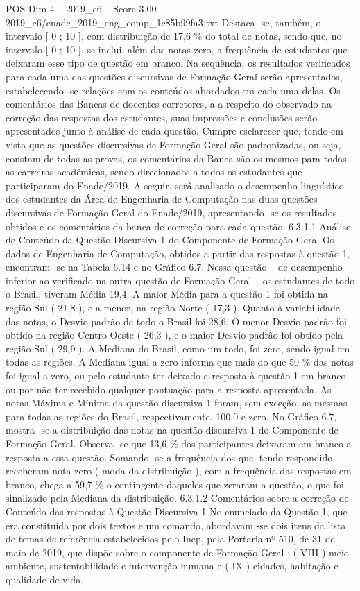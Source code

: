 \begin{textsample}{POS Dim 4 – 2019\_c6 – Score 3.00 – 2019\_c6/enade\_2019\_eng\_comp\_1c85b99fa3.txt}
Destaca -se, também, o intervalo [ 0 ; 10 ], com distribuição de 17,6 \% do total de notas, sendo que, no intervalo [ 0 ; 10 ], se inclui, além das notas zero, a frequência de estudantes que deixaram esse tipo de questão em branco.
Na sequência, os resultados verificados para cada uma das questões discursivas de Formação Geral serão apresentados, estabelecendo -se relações com os conteúdos abordados em cada uma delas.
Os comentários das Bancas de docentes corretores, a a respeito do observado na correção das respostas dos estudantes, suas impressões e conclusões serão apresentados junto à análise de cada questão.
Cumpre esclarecer que, tendo em vista que as questões discursivas de Formação Geral são padronizadas, ou seja, constam de todas as provas, os comentários da Banca são os mesmos para todas as carreiras acadêmicas, sendo direcionados a todos os estudantes que participaram do Enade/2019.
A seguir, será analisado o desempenho linguístico dos estudantes da Área de Engenharia de Computação nas duas questões discursivas de Formação Geral do Enade/2019, apresentando -se os resultados obtidos e os comentários da banca de correção para cada questão. 6.3.1.1 Análise de Conteúdo da Questão Discursiva 1 do Componente de Formação Geral Os dados de Engenharia de Computação, obtidos a partir das respostas à questão 1, encontram -se na Tabela 6.14 e no Gráfico 6.7.
Nessa questão – de desempenho inferior ao verificado na outra questão de Formação Geral – os estudantes de todo o Brasil, tiveram Média 19,4.
A maior Média para a questão 1 foi obtida na região Sul ( 21,8 ), e a menor, na região Norte ( 17,3 ).
Quanto à variabilidade das notas, o Desvio padrão de todo o Brasil foi 28,6.
O menor Desvio padrão foi obtido na região Centro-Oeste ( 26,3 ), e o maior Desvio padrão foi obtido pela região Sul ( 29,9 ).
A Mediana do Brasil, como um todo, foi zero, sendo igual em todas as regiões.
A Mediana igual a zero informa que mais do que 50 \% das notas foi igual a zero, ou pelo estudante ter deixado a resposta à questão 1 em branco ou por não ter recebido qualquer pontuação para a resposta apresentada.
As notas Máxima e Mínima da questão discursiva 1 foram, sem exceção, as mesmas para todas as regiões do Brasil, respectivamente, 100,0 e zero.
No Gráfico 6.7, mostra -se a distribuição das notas na questão discursiva 1 do Componente de Formação Geral.
Observa -se que 13,6 \% dos participantes deixaram em branco a resposta a essa questão.
Somando -se a frequência dos que, tendo respondido, receberam nota zero ( moda da distribuição ), com a frequência das respostas em branco, chega a 59,7 \% o contingente daqueles que zeraram a questão, o que foi sinalizado pela Mediana da distribuição. 6.3.1.2 Comentários sobre a correção de Conteúdo das respostas à Questão Discursiva 1 No enunciado da Questão 1, que era constituída por dois textos e um comando, abordavam -se dois itens da lista de temas de referência estabelecidos pelo Inep, pela Portaria nº 510, de 31 de maio de 2019, que dispõe sobre o componente de Formação Geral : ( VIII ) meio ambiente, sustentabilidade e intervenção humana e ( IX ) cidades, habitação e qualidade de vida.

\end{textsample}
